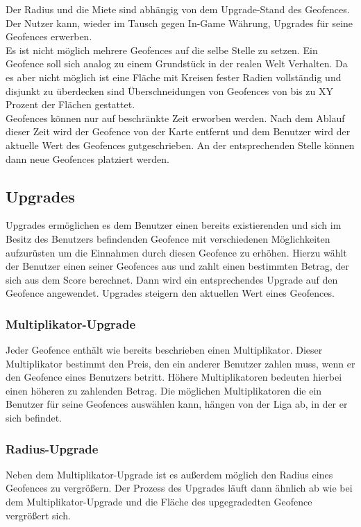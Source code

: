 \documentclass{scrreprt}
\begin{document}
Der Radius und die Miete sind abhängig von dem Upgrade-Stand des Geofences. Der Nutzer kann, wieder im Tausch gegen In-Game Währung, Upgrades für seine Geofences erwerben.\\

Es ist nicht möglich mehrere Geofences auf die selbe Stelle zu setzen. Ein Geofence soll sich analog zu einem Grundstück in der realen Welt Verhalten. Da es aber nicht möglich ist eine Fläche mit Kreisen fester Radien vollständig und disjunkt zu überdecken sind Überschneidungen von Geofences von bis zu XY Prozent der Flächen gestattet.\\

Geofences können nur auf beschränkte Zeit erworben werden. Nach dem Ablauf dieser Zeit wird der Geofence von der Karte entfernt und dem Benutzer wird der aktuelle Wert des Geofences gutgeschrieben. An der entsprechenden Stelle können dann neue Geofences platziert werden.
\subsection{Upgrades}
Upgrades ermöglichen es dem Benutzer einen bereits existierenden und sich im Besitz des Benutzers befindenden Geofence mit verschiedenen Möglichkeiten aufzurüsten um die Einnahmen durch diesen Geofence zu erhöhen. Hierzu wählt der Benutzer einen seiner Geofences aus und zahlt einen bestimmten Betrag, der sich aus dem Score berechnet. Dann wird ein entsprechendes Upgrade auf den Geofence angewendet. Upgrades steigern den aktuellen Wert eines Geofences.
\subsubsection{Multiplikator-Upgrade}
Jeder Geofence enthält wie bereits beschrieben einen Multiplikator. Dieser Multiplikator bestimmt den Preis, den ein anderer Benutzer zahlen muss, wenn er den Geofence eines Benutzers betritt. Höhere Multiplikatoren bedeuten hierbei einen höheren zu zahlenden Betrag. Die möglichen Multiplikatoren die ein Benutzer für seine Geofences auswählen kann, hängen von der Liga ab, in der er sich befindet.
\subsubsection{Radius-Upgrade}
Neben dem Multiplikator-Upgrade ist es außerdem möglich den Radius eines Geofences zu vergrößern. Der Prozess des Upgrades läuft dann ähnlich ab wie bei dem Multiplikator-Upgrade und die Fläche des upgegradedten Geofence vergrößert sich.
\end{document}
